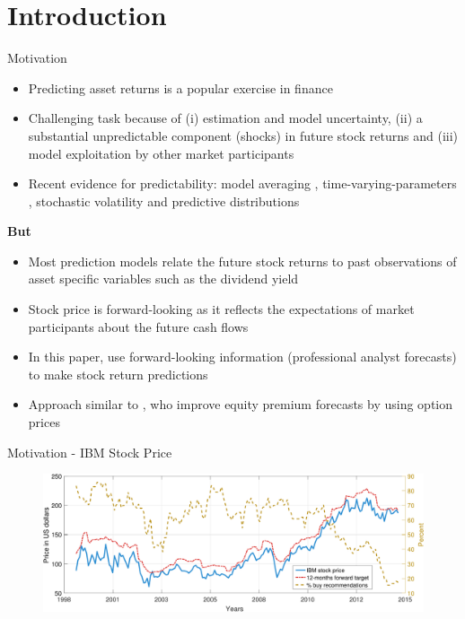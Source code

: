 \documentclass[9pt,xcolor=x11names,compress]{beamer}
\title{\titleinfo}
\let\oldcite=\cite
\renewcommand{\cite}[1]{\textcolor{dblue}{\oldcite{#1}}}
\theoremstyle{standard}
\theoremstyle{notes}
\begin{document}
\section{Introduction}
\begin{frame}
\titlepage
\end{frame}

\begin{frame}{Motivation}
	\begin{itemize}
		\item Predicting asset returns is a popular exercise in finance
		\item Challenging task because of (i) estimation and model uncertainty, (ii) a substantial unpredictable component (shocks) in future stock returns and (iii) model exploitation by other market participants
		\item Recent evidence for predictability: model averaging \cite{pettenuzzo2016}, time-varying-parameters \cite{dangl2012}, stochastic volatility and predictive distributions \cite{johannes2014}
	\end{itemize}
\pause
\textbf{But}
\begin{itemize}
	\item Most prediction models relate the future stock returns to past observations of asset specific variables such as the dividend yield
	\item Stock price is forward-looking as it reflects the expectations of market participants about the future cash flows
	\item In this paper, use forward-looking information (professional analyst forecasts) to make stock return predictions
	\item Approach similar to \cite{metaxoglou2016}, who improve equity premium forecasts by using option prices
\end{itemize}
\end{frame}

\begin{frame}{Motivation - IBM Stock Price}
\begin{figure}
	\centering
	\includegraphics[width=1\linewidth]{../../Tex/plots/IBM_price_plot}
	\label{fig:ibmpriceplot}
\end{figure}

\end{frame}
\end{document}
